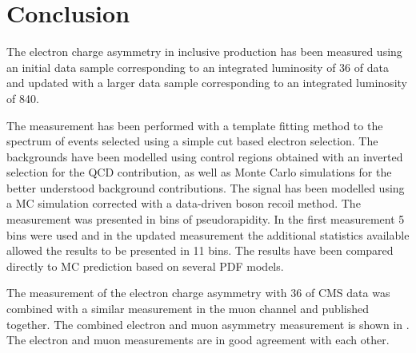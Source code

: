 \chapter{Conclusion}
\label{chap:conclusion}

The electron charge asymmetry in inclusive \PW production has been measured
using an initial data sample corresponding to an integrated luminosity of
\unit{36}{\invpb} of data and updated with a larger data sample corresponding to
an integrated luminosity of \unit{840}{\invpb}.

The measurement has been performed with a template fitting method to the \ETm
spectrum of events selected using a simple cut based electron selection.
The backgrounds have been modelled using control regions obtained with an
inverted selection for the QCD contribution, as well as Monte Carlo simulations
for the better understood background contributions.
The signal has been modelled using a MC simulation corrected with a data-driven
boson recoil method.
The measurement was presented in bins of pseudorapidity. In the first
measurement 5 bins were used and in the updated measurement the additional
statistics available allowed the results to be presented in 11 bins.
The results have been compared directly to MC prediction based on several PDF
models. 


The measurement of the electron charge asymmetry with
\unit{36}{\invpb} of CMS data\cite{baisini2010electron} was combined with a
similar measurement in the muon channel\cite{majumder2010muon} and published
together\cite{asym36}.  The combined electron and muon asymmetry measurement is
shown in . The electron and muon measurements are in
good agreement with each other.

